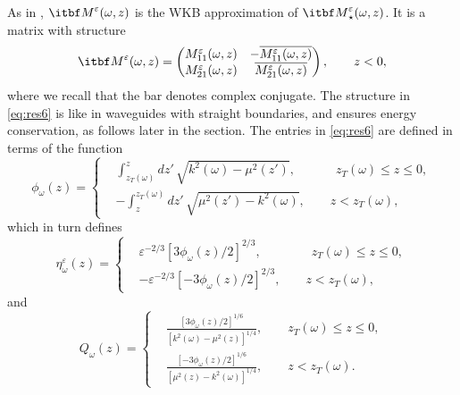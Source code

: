 \documentclass[final]{siamltex}
\begin{document}
As in \cite{lynn1970uniform}, ${{\itbf M}}^{\varepsilon}({\omega},z)$ is the WKB
approximation of ${{\itbf M}}^{\varepsilon}_\star({\omega},z)$. It is a matrix with structure 
\begin{equation}
{{\itbf M}}^{\varepsilon}({\omega},z) = \begin{pmatrix} M_{11}^{\varepsilon}({\omega},z) & -
  \overline{M_{11}^{\varepsilon}({\omega},z)} \\ M_{21}^{\varepsilon}({\omega},z) &
  \overline{M_{21}^{\varepsilon}({\omega},z)} \end{pmatrix}, \qquad z < 0,
\label{eq:res6}
\end{equation}
where we recall that the bar denotes complex conjugate. The structure
in \eqref{eq:res6}
is like in waveguides with straight boundaries, and ensures energy
conservation, as follows later in the section. The entries in
\eqref{eq:res6} are defined in terms of the function
\begin{equation}
\phi_{\omega}(z) =\left\{ \begin{aligned} &\int_{z_T({\omega})}^z dz' \,
  \sqrt{k^2({\omega})-\mu^2(z')}, \quad \qquad  ~z_T({\omega}) \le z \le 0,
  \\ &-\int^{z_T({\omega})}_z dz' \, \sqrt{\mu^2(z')-k^2({\omega})}, \qquad  z <
  z_T({\omega}),
\end{aligned} \right.
\label{eq:res7}
\end{equation}
which in turn defines
\begin{equation}
\eta_{\omega}^{\varepsilon}(z) = \left\{ \begin{aligned} & {{\varepsilon}^{-2/3}} \left[ 3
    \phi_{\omega}(z)/2\right]^{2/3}, \qquad \qquad z_T({\omega}) \le z \le 0,
  \\ & -{\varepsilon}^{-2/3} \left[- 3 \phi_{\omega}(z)/2\right]^{2/3}, \qquad  z <
  z_T({\omega}),
\end{aligned} \right.
\label{eq:res8}
\end{equation}
and 
\begin{equation}
Q_{\omega}(z) = \left\{ \begin{aligned} & \frac{\left[ 3
      \phi_{\omega}(z)/2\right]^{1/6}}{\left[k^2({\omega})-\mu^2(z)\right]^{1/4}},
  \qquad z_T({\omega}) \le z \le 0, \\ & \frac{\left[ -3
      \phi_{\omega}(z)/2\right]^{1/6}}{\left[\mu^2(z)-k^2({\omega})\right]^{1/4}},
  \qquad z <z_T({\omega}).
\end{aligned} \right.
\label{eq:res9}
\end{equation}
\end{document}
